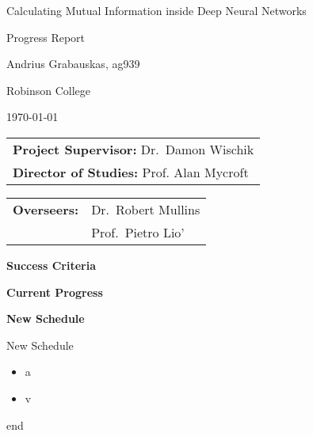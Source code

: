 \documentclass[11pt]{article}
\begin{document}
\thispagestyle{empty}

\centerline{\large Calculating Mutual Information inside Deep Neural Networks}
\centerline{\large Progress Report}
\vspace{0.2in}

\centerline{Andrius Grabauskas, ag939}
\centerline{Robinson College}
\centerline{\today}

\vspace{0.2in}



\begin{tabular}[t]{@{}l}
{\bf Project Supervisor:} Dr.\ Damon Wischik \\[3mm]
{\bf Director of Studies:} Prof. Alan Mycroft
\end{tabular}
\hfill
\begin{tabular}[t]{@{}l @{}l}
{\bf Overseers: } & Dr.\ Robert Mullins \\[3mm] 
& Prof.\ Pietro Lio'
\end{tabular}

\vspace{0.3in}

\large{\bf Success Criteria}

\large{\bf Current Progress}

\large{\bf New Schedule}

New Schedule

\begin{itemize}
\item
{

    a
}
\item
{

    v
}
\end{itemize}

end
\end{document}
